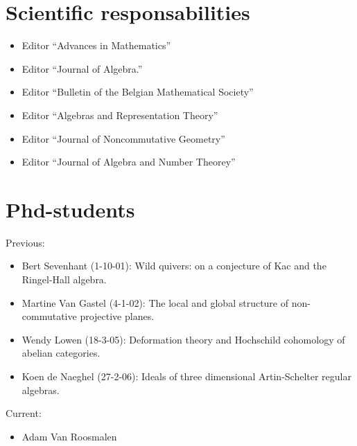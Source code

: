 \documentclass{amsart}
\begin{document}
\section*{Scientific responsabilities}
\begin{itemize}
\item Editor ``Advances in Mathematics''
\item Editor ``Journal of Algebra.''
\item Editor ``Bulletin of the Belgian Mathematical Society''
\item Editor ``Algebras and Representation Theory''
\item Editor ``Journal of Noncommutative Geometry''
\item Editor ``Journal of Algebra and Number Theorey''
\end{itemize}
\section*{Phd-students}
\noindent Previous:
\begin{itemize}
\item Bert Sevenhant (1-10-01): Wild quivers: on a conjecture of Kac
  and the Ringel-Hall algebra.
\item Martine Van Gastel (4-1-02): The local and global structure of
  non-commutative projective planes.
\item
Wendy Lowen (18-3-05): Deformation theory and Hochschild cohomology
of abelian categories.
\item Koen de Naeghel (27-2-06):  Ideals of three dimensional
Artin-Schelter regular algebras.
\end{itemize}
Current:
\begin{itemize}
\item Adam Van Roosmalen
\end{itemize}

\end{document}
